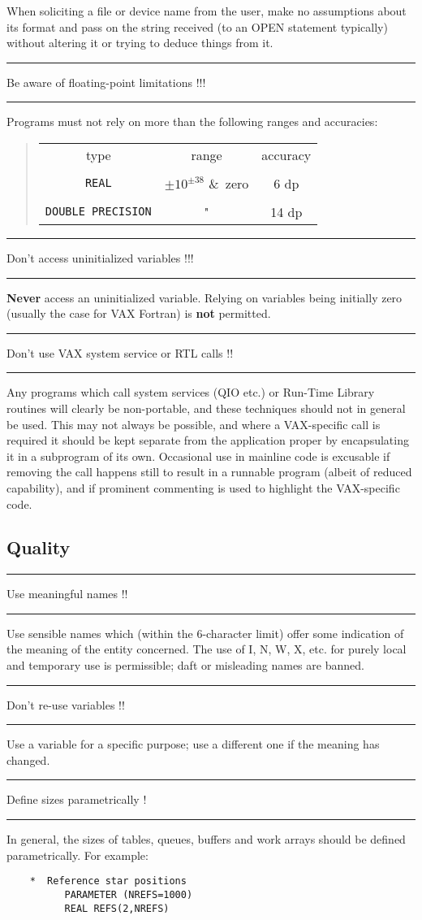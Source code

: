 \documentclass[twoside,11pt]{article}
\newcounter{sruleno}
\newcommand{\srule}[1]{
    \addtocounter{sruleno}{1}
    \goodbreak
    \rule[0.5ex]{\textwidth}{0.3mm}
    {\Large #1 \hfill {\thesruleno}}
    \rule[0.5ex]{\textwidth}{0.1mm}
}
\newcommand{\srule}[1]{
       \addtocounter{sruleno}{1}
       \begin{rawhtml} <HR> \end{rawhtml}
       {\Large \thesruleno}~~~~{\Large #1}
       \begin{rawhtml} <HR> \end{rawhtml}
       \end{tabular}
  }
\renewcommand{\_}{{\tt\char'137}}
\begin{document}
When soliciting a file or device name from the
user, make no assumptions about its format and pass on the
string received (to an OPEN statement typically) without altering
it or trying to deduce things from it.

\srule{Be aware of floating-point limitations !!!}
Programs must not rely on more than the following ranges and accuracies:
\begin{quote}
\begin{tabular}{ccc}
type & range & accuracy \\ \\
\verb|REAL| & $\pm10^{\pm38}$ \&\ zero & 6 dp \\ \\
\verb|DOUBLE PRECISION| & " & 14 dp
\end{tabular}
\end{quote}

\srule{Don't access uninitialized variables !!!}
{\bf Never} access an uninitialized variable.
Relying on variables being initially zero (usually
the case for VAX Fortran) is {\bf not} permitted.

\srule{Don't use VAX system service or RTL calls !!}
Any programs which call system services (QIO etc.) or Run-Time Library
routines will clearly be non-portable, and these techniques should
not in general be used.  This may not always be possible, and where
a VAX-specific call is required it should be kept separate from
the application proper by encapsulating it in a subprogram of
its own.  Occasional use in mainline code is excusable if
removing the call happens still to result in a runnable program (albeit
of reduced capability), and if prominent commenting is used to highlight
the VAX-specific code.

\goodbreak
\subsection{Quality}

\srule{Use meaningful names !!}
Use sensible names which (within the 6-character limit) offer some
indication of the meaning of the entity concerned.
The use of I, N, W, X, etc. for purely local and
temporary use is permissible; daft or misleading names are banned.

\srule{Don't re-use variables !!}
Use a variable for a specific purpose; use a different one if the meaning has
changed.

\srule{Define sizes parametrically !}
In general, the sizes of tables, queues, buffers and work arrays should be
defined parametrically.
For example:
\begin{verbatim}
    *  Reference star positions
          PARAMETER (NREFS=1000)
          REAL REFS(2,NREFS)
\end{verbatim}
\end{document}
